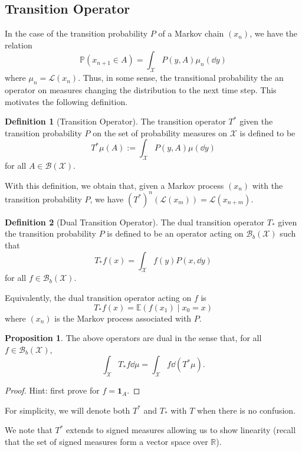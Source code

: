 \documentclass[]{article}
\theoremstyle{definition}
\theoremstyle{definition}
\newtheorem{definition}{Definition}[section]
\newtheorem{proposition}{Proposition}[section]
\begin{document}
\subsection{Transition Operator}

In the case of the transition probability \(P\) of a Markov chain \((x_n)\), we have the 
relation 
\[\mathbb{P}(x_{n + 1} \in A) = \int_{\mathcal{X}} P(y, A) \mu_n(\dd y)\]
where \(\mu_n = \mathcal{L}(x_n)\). Thus, in some sense, the transitional probability 
the an operator on measures changing the distribution to the next time step. 
This motivates the following definition.

\begin{definition}[Transition Operator]
  The transition operator \(T^*\) given the transition probability \(P\) on the 
  set of probability measures on \(\mathcal{X}\) is defined to be 
  \[T^* \mu(A) := \int_{\mathcal{X}} P(y, A) \mu(\dd y)\]
  for all \(A \in \mathcal{B}(\mathcal{X})\).
\end{definition}

With this definition, we obtain that, given a Markov process \((x_n)\) with the 
transition probability \(P\), we have \((T^*)^n(\mathcal{L}(x_m)) = \mathcal{L}(x_{n + m})\).  

\begin{definition}[Dual Transition Operator]
  The dual transition operator \(T_*\) given the transition probability \(P\) is 
  defined to be an operator acting on \(\mathcal{B}_b(\mathcal{X})\) such that 
  \[T_* f(x) = \int_{\mathcal{X}} f(y) P(x, \dd y)\]
  for all \(f \in \mathcal{B}_b(\mathcal{X})\).
\end{definition}

Equivalently, the dual transition operator acting on \(f\) is 
\[T_* f(x) = \mathbb{E}(f(x_1) \mid x_0 = x)\]
where \((x_n)\) is the Markov process associated with \(P\).

\begin{proposition}
  The above operators are dual in the sense that, for all \(f \in \mathcal{B}_b(\mathcal{X})\),
  \[\int_{\mathcal{X}} T_* f \dd \mu = \int_{\mathcal{X}} f \dd(T^* \mu).\]
\end{proposition}
\begin{proof}
  Hint: first prove for \(f = \mathbf{1}_A\).
\end{proof}

For simplicity, we will denote both \(T^*\) and \(T_*\) with \(T\) when there is no 
confusion.

We note that \(T^*\) extends to signed measures allowing us to show linearity 
(recall that the set of signed measures form a vector space over \(\mathbb{R}\)).
\end{document}
